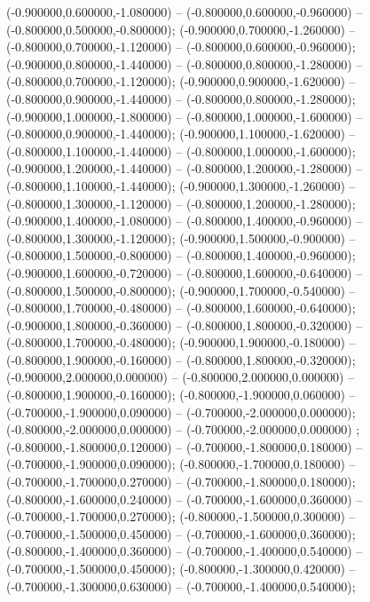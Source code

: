  (-0.900000,0.600000,-1.080000) -- (-0.800000,0.600000,-0.960000) -- (-0.800000,0.500000,-0.800000);
 (-0.900000,0.700000,-1.260000) -- (-0.800000,0.700000,-1.120000) -- (-0.800000,0.600000,-0.960000);
 (-0.900000,0.800000,-1.440000) -- (-0.800000,0.800000,-1.280000) -- (-0.800000,0.700000,-1.120000);
 (-0.900000,0.900000,-1.620000) -- (-0.800000,0.900000,-1.440000) -- (-0.800000,0.800000,-1.280000);
 (-0.900000,1.000000,-1.800000) -- (-0.800000,1.000000,-1.600000) -- (-0.800000,0.900000,-1.440000);
 (-0.900000,1.100000,-1.620000) -- (-0.800000,1.100000,-1.440000) -- (-0.800000,1.000000,-1.600000);
 (-0.900000,1.200000,-1.440000) -- (-0.800000,1.200000,-1.280000) -- (-0.800000,1.100000,-1.440000);
 (-0.900000,1.300000,-1.260000) -- (-0.800000,1.300000,-1.120000) -- (-0.800000,1.200000,-1.280000);
 (-0.900000,1.400000,-1.080000) -- (-0.800000,1.400000,-0.960000) -- (-0.800000,1.300000,-1.120000);
 (-0.900000,1.500000,-0.900000) -- (-0.800000,1.500000,-0.800000) -- (-0.800000,1.400000,-0.960000);
 (-0.900000,1.600000,-0.720000) -- (-0.800000,1.600000,-0.640000) -- (-0.800000,1.500000,-0.800000);
 (-0.900000,1.700000,-0.540000) -- (-0.800000,1.700000,-0.480000) -- (-0.800000,1.600000,-0.640000);
 (-0.900000,1.800000,-0.360000) -- (-0.800000,1.800000,-0.320000) -- (-0.800000,1.700000,-0.480000);
 (-0.900000,1.900000,-0.180000) -- (-0.800000,1.900000,-0.160000) -- (-0.800000,1.800000,-0.320000);
 (-0.900000,2.000000,0.000000) -- (-0.800000,2.000000,0.000000) -- (-0.800000,1.900000,-0.160000);
 (-0.800000,-1.900000,0.060000) -- (-0.700000,-1.900000,0.090000) -- (-0.700000,-2.000000,0.000000);
 (-0.800000,-2.000000,0.000000) -- (-0.700000,-2.000000,0.000000) ;
 (-0.800000,-1.800000,0.120000) -- (-0.700000,-1.800000,0.180000) -- (-0.700000,-1.900000,0.090000);
 (-0.800000,-1.700000,0.180000) -- (-0.700000,-1.700000,0.270000) -- (-0.700000,-1.800000,0.180000);
 (-0.800000,-1.600000,0.240000) -- (-0.700000,-1.600000,0.360000) -- (-0.700000,-1.700000,0.270000);
 (-0.800000,-1.500000,0.300000) -- (-0.700000,-1.500000,0.450000) -- (-0.700000,-1.600000,0.360000);
 (-0.800000,-1.400000,0.360000) -- (-0.700000,-1.400000,0.540000) -- (-0.700000,-1.500000,0.450000);
 (-0.800000,-1.300000,0.420000) -- (-0.700000,-1.300000,0.630000) -- (-0.700000,-1.400000,0.540000);
